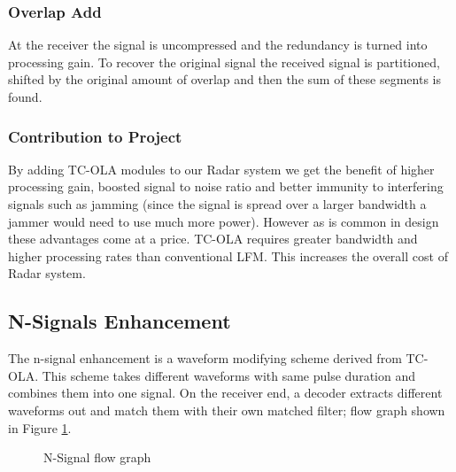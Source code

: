 \documentclass[letterpaper, 12 pt, conference]{report}
\numberwithin{figure}{section}
\begin{document}
\subsubsection{Overlap Add}
At the receiver the signal is uncompressed and the redundancy is turned into processing gain. To recover the original signal the received signal is partitioned, shifted by the original amount of overlap and then the sum of these segments is found.
\subsubsection{Contribution to Project}
By adding TC-OLA modules to our Radar system we get the benefit of higher processing gain, boosted signal to noise ratio and better immunity to interfering signals such as jamming (since the signal is spread over a larger bandwidth a jammer would need to use much more power). However as is common in design these advantages come at a price. TC-OLA requires greater bandwidth and higher processing rates than conventional LFM. This increases the overall cost of Radar system.
\subsection{N-Signals Enhancement}
The n-signal enhancement is a waveform modifying scheme derived from TC-OLA. This scheme takes different waveforms with same pulse duration and combines them into one signal. On the receiver end, a decoder extracts different waveforms out and match them with their own matched filter; flow graph shown in Figure \ref{fig:nsigfg}.
\begin{figure}[h]
\centering{}
\caption{N-Signal flow graph}
\label{fig:nsigfg}
\end{figure}
\end{document}
